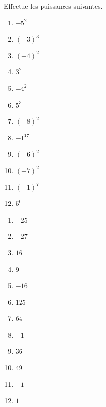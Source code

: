 \documentclass[../../syllabus_1.tex]{subfiles}
\begin{document}
\begin{exercise}
    Effectue les puissances suivantes.
    \begin{enumerate}[itemsep=.3cm, cols=3]
        \item \(-5^2\)
        \item \((-3)^3\)
        \item \((-4)^2\)
        \item \(3^2\)
        \item \(-4^2\)
        \item \(5^3\)
        \item \((-8)^2\)
        \item \(-1^{17}\)
        \item \((-6)^2\)
        \item \((-7)^2\)
        \item \((-1)^7\)
        \item \(5^0\)
    \end{enumerate}
\end{exercise}
\begin{solution}
    \begin{enumerate}[cols=4]
        \item \(-25\)
        \item \(-27\)
        \item \(16\)
        \item \(9\)
        \item \(-16\)
        \item \(125\)
        \item \(64\)
        \item \(-1\)
        \item \(36\)
        \item \(49\)
        \item \(-1\)
        \item \(1\)
    \end{enumerate}
\end{solution}
\end{document}
